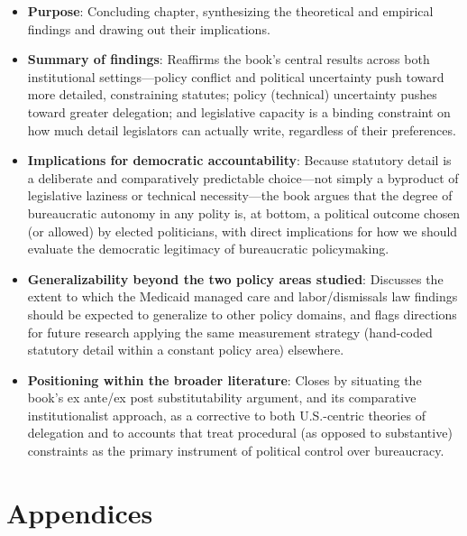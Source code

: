 \documentclass[12pt]{article}
\begin{document}
\begin{itemize}[leftmargin=*, itemsep=4pt]
    \item \textbf{Purpose}: Concluding chapter, synthesizing the theoretical and empirical findings and drawing out their implications.
    \item \textbf{Summary of findings}: Reaffirms the book's central results across both institutional settings---policy conflict and political uncertainty push toward more detailed, constraining statutes; policy (technical) uncertainty pushes toward greater delegation; and legislative capacity is a binding constraint on how much detail legislators can actually write, regardless of their preferences.
    \item \textbf{Implications for democratic accountability}: Because statutory detail is a deliberate and comparatively predictable choice---not simply a byproduct of legislative laziness or technical necessity---the book argues that the degree of bureaucratic autonomy in any polity is, at bottom, a political outcome chosen (or allowed) by elected politicians, with direct implications for how we should evaluate the democratic legitimacy of bureaucratic policymaking.
    \item \textbf{Generalizability beyond the two policy areas studied}: Discusses the extent to which the Medicaid managed care and labor/dismissals law findings should be expected to generalize to other policy domains, and flags directions for future research applying the same measurement strategy (hand-coded statutory detail within a constant policy area) elsewhere.
    \item \textbf{Positioning within the broader literature}: Closes by situating the book's ex ante/ex post substitutability argument, and its comparative institutionalist approach, as a corrective to both U.S.-centric theories of delegation and to accounts that treat procedural (as opposed to substantive) constraints as the primary instrument of political control over bureaucracy.
\end{itemize}

\section{Appendices}
\end{document}
